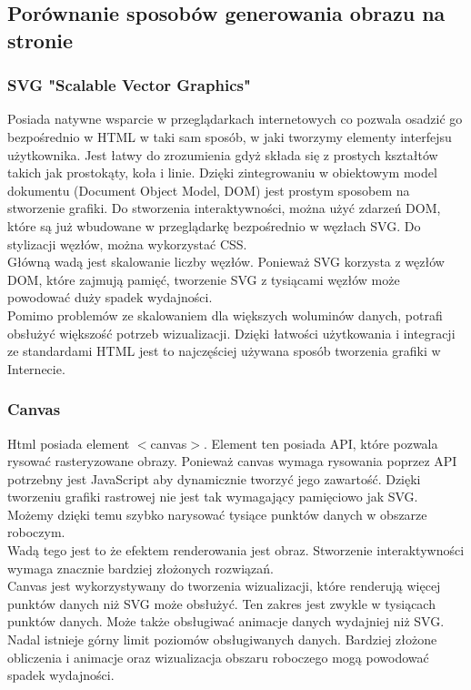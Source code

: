 \documentclass[12pt,a4paper]{article} %
\begin{document}
\subsection{Porównanie sposobów generowania obrazu na stronie}
    \subsubsection{SVG "Scalable Vector Graphics"}
        Posiada natywne wsparcie w przeglądarkach internetowych co pozwala osadzić go bezpośrednio w HTML w taki sam sposób, w jaki tworzymy elementy interfejsu użytkownika. Jest łatwy do zrozumienia gdyż składa się z prostych kształtów takich jak prostokąty, koła i linie. Dzięki zintegrowaniu w obiektowym model dokumentu (Document Object Model, DOM) jest prostym sposobem na stworzenie grafiki. Do stworzenia interaktywności, można użyć zdarzeń DOM, które są już wbudowane w przeglądarkę bezpośrednio w węzłach SVG. Do stylizacji węzłów, można wykorzystać CSS.\\
        Główną wadą jest skalowanie liczby węzłów. Ponieważ SVG korzysta z węzłów DOM, które zajmują pamięć, tworzenie SVG z tysiącami węzłów może powodować duży spadek wydajności.\\
        Pomimo problemów ze skalowaniem dla większych woluminów danych, potrafi obsłużyć większość potrzeb wizualizacji. Dzięki łatwości użytkowania i integracji ze standardami HTML jest to najczęściej używana sposób tworzenia grafiki w Internecie.

    \subsubsection{Canvas}
        Html posiada element $<$canvas$>$. Element ten posiada API, które pozwala rysować rasteryzowane obrazy. Ponieważ canvas wymaga rysowania poprzez API potrzebny jest JavaScript aby dynamicznie tworzyć jego zawartość. Dzięki tworzeniu grafiki rastrowej nie jest tak wymagający pamięciowo jak SVG. Możemy dzięki temu szybko narysować tysiące punktów danych w obszarze roboczym. \\
        Wadą tego jest to że efektem renderowania jest obraz. Stworzenie interaktywności wymaga znacznie bardziej złożonych rozwiązań.\\
        Canvas jest wykorzystywany do tworzenia wizualizacji, które renderują więcej punktów danych niż SVG może obsłużyć. Ten zakres jest zwykle w tysiącach punktów danych. Może także obsługiwać animacje danych wydajniej niż SVG. Nadal istnieje górny limit poziomów obsługiwanych danych. Bardziej złożone obliczenia i animacje oraz wizualizacja obszaru roboczego mogą powodować spadek wydajności.
        
\end{document}
